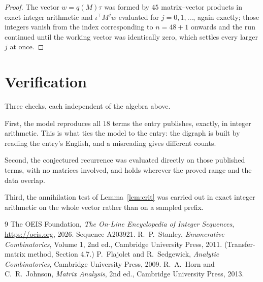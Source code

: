 \documentclass[11pt,a4paper]{article}
\theoremstyle{plain}
\theoremstyle{definition}
\begin{document}
\begin{proof}
The vector $w=q(M)\tau$ was formed by $45$ matrix--vector products in exact integer
arithmetic and $\iota^{\!\top}M^{j}w$ evaluated for $j=0,1,\dots$, again exactly; those
integers vanish from the index corresponding to $n=48+1$ onwards and the run continued
until the working vector was identically zero, which settles every larger $j$ at once.
\end{proof}

\section{Verification}

Three checks, each independent of the algebra above.

First, the model reproduces all $18$ terms the entry publishes, exactly, in integer
arithmetic. This is what ties the model to the entry: the digraph is built by reading the
entry's English, and a misreading gives different counts.

Second, the conjectured recurrence was evaluated directly on those published terms, with no
matrices involved, and holds wherever the proved range and the data overlap.

Third, the annihilation test of Lemma~\ref{lem:crit} was carried out in exact integer
arithmetic on the whole vector rather than on a sampled prefix.

\begin{thebibliography}{9}
 The OEIS Foundation, \emph{The On-Line Encyclopedia of Integer
Sequences}, \url{https://oeis.org}, 2026. Sequence A203921.
 R.~P.~Stanley, \emph{Enumerative Combinatorics}, Volume 1, 2nd ed.,
Cambridge University Press, 2011. (Transfer-matrix method, Section 4.7.)
 P.~Flajolet and R.~Sedgewick, \emph{Analytic Combinatorics}, Cambridge
University Press, 2009.
 R.~A.~Horn and C.~R.~Johnson, \emph{Matrix Analysis}, 2nd ed., Cambridge
University Press, 2013.
\end{thebibliography}
\end{document}
